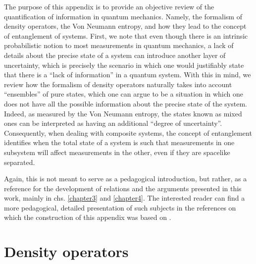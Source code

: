 \documentclass[
12pt,		%
openright,	%
twoside,  %
a4paper,			%
chapter=TITLE,		%
english,			%
french,				%
spanish,			%
brazil				%
]{USPSC-classe/USPSC}
\begin{document}
\begin{apendicesenv}
The purpose of this appendix is to provide an objective review of the quantification of information in quantum mechanics. Namely, the formalism of density operators, the Von Neumann entropy, and how they lead to the concept of entanglement of systems. First, we note that even though there is an intrinsic probabilistic notion to most measurements in quantum mechanics, a lack of details about the precise state of a system can introduce another layer of uncertainty, which is precisely the scenario in which one would justifiably state that there is a ``lack of information'' in a quantum system. With this in mind, we review how the formalism of density operators naturally takes into account ``ensembles'' of pure states, which one can argue to be a situation in which one does not have all the possible information about the precise state of the system. Indeed, as measured by the Von Neumann entropy, the states known as mixed ones can be interpreted as having an additional ``degree of uncertainty''. Consequently, when dealing with composite systems, the concept of entanglement identifies when the total state of a system is such that measurements in one subsystem will affect measurements in the other, even if they are spacelike separated. 

Again, this is not meant to serve as a pedagogical introduction, but rather, as a reference for the development of relations and the arguments presented in this work, mainly in chs. \ref{chapter3} and \ref{chapter4}. The interested reader can find a more pedagogical, detailed presentation of such subjects in the references on which the construction of this appendix was based on \cite{Sakurai1994, Blum2012, Nielsen2010, Horodecki2009}.

\section{Density operators}\label{informationtheory}


\end{apendicesenv}
\end{document}
